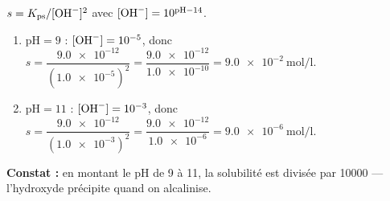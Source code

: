 \documentclass[11pt,a4paper]{article}
\begin{document}
\begin{corrige}
$s = K_{\mathrm{ps}}/[\ce{OH-}]^{2}$ avec $[\ce{OH-}]=10^{\mathrm{pH}-14}$.
\begin{enumerate}[label=\alph*)]
  \item $\mathrm{pH}=9$ : $[\ce{OH-}]=10^{-5}$, donc
        $s=\dfrac{\num{9.0e-12}}{(\num{1.0e-5})^{2}}=\dfrac{\num{9.0e-12}}{\num{1.0e-10}}=\qty{9.0e-2}{\mole\per\litre}$.
  \item $\mathrm{pH}=11$ : $[\ce{OH-}]=10^{-3}$, donc
        $s=\dfrac{\num{9.0e-12}}{(\num{1.0e-3})^{2}}=\dfrac{\num{9.0e-12}}{\num{1.0e-6}}=\qty{9.0e-6}{\mole\per\litre}$.
\end{enumerate}
\textbf{Constat :} en montant le pH de 9 à 11, la solubilité est divisée par \num{10000} — l'hydroxyde
précipite quand on alcalinise.
\end{corrige}
\end{document}
